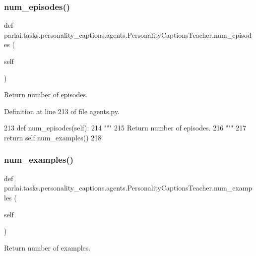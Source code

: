 \subsubsection{\texorpdfstring{num\+\_\+episodes()}{num\_episodes()}}
{\footnotesize\ttfamily def parlai.\+tasks.\+personality\+\_\+captions.\+agents.\+Personality\+Captions\+Teacher.\+num\+\_\+episodes (\begin{DoxyParamCaption}\item[{}]{self }\end{DoxyParamCaption})}

\begin{DoxyVerb}Return number of episodes.
\end{DoxyVerb}
 

Definition at line 213 of file agents.\+py.


\begin{DoxyCode}
213     \textcolor{keyword}{def }num\_episodes(self):
214         \textcolor{stringliteral}{"""}
215 \textcolor{stringliteral}{        Return number of episodes.}
216 \textcolor{stringliteral}{        """}
217         \textcolor{keywordflow}{return} self.num\_examples()
218 
\end{DoxyCode}
\mbox{\label{classparlai_1_1tasks_1_1personality__captions_1_1agents_1_1PersonalityCaptionsTeacher_aa19ecea79bceee398eafd3a903e67349}} 
\subsubsection{\texorpdfstring{num\+\_\+examples()}{num\_examples()}}
{\footnotesize\ttfamily def parlai.\+tasks.\+personality\+\_\+captions.\+agents.\+Personality\+Captions\+Teacher.\+num\+\_\+examples (\begin{DoxyParamCaption}\item[{}]{self }\end{DoxyParamCaption})}

\begin{DoxyVerb}Return number of examples.
\end{DoxyVerb}
 

